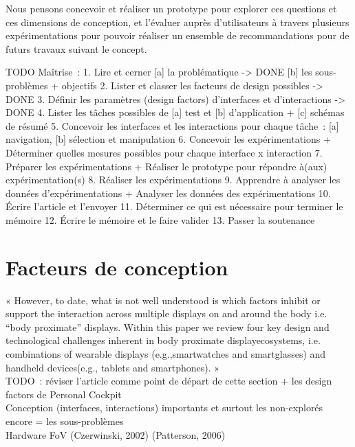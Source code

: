 Nous pensons concevoir et réaliser un prototype pour explorer ces questions et ces dimensions de conception, et l'évaluer auprès d'utilisateurs à travers plusieurs expérimentations pour pouvoir réaliser un ensemble de recommandations pour de futurs travaux suivant le concept.

TODO Maîtrise~:
1. Lire et cerner 
   [a] la problématique -> DONE
   [b] les sous-problèmes + objectifs
2. Lister et classer les facteurs de design possibles -> DONE
3. Définir les paramètres (design factors) d'interfaces et d'interactions -> DONE
4. Lister les tâches possibles de 
   [a] test 
   et [b] d'application 
   + [c] schémas de résumé
5. Concevoir les interfaces et les interactions pour chaque tâche~:
   [a] navigation, 
   [b] sélection et manipulation
6. Concevoir les expérimentations 
   + Déterminer quelles mesures possibles pour chaque interface x interaction
7. Préparer les expérimentations 
   + Réaliser le prototype pour répondre à(aux) expérimentation(s)
8. Réaliser les expérimentations
9. Apprendre à analyser les données d'expérimentations
   + Analyser les données des expérimentations
10. Écrire l'article et l'envoyer
11. Déterminer ce qui est nécessaire pour terminer le mémoire
12. Écrire le mémoire et le faire valider
13. Passer la soutenance



\section*{Facteurs de conception}
« However, to date, what is not well understood is which factors inhibit or support the interaction across multiple displays on and around the body i.e. “body proximate” displays. Within this paper we review four key design and technological challenges inherent in body proximate displayecosystems, i.e. combinations of wearable displays (e.g.,smartwatches and smartglasses) and handheld devices(e.g., tablets and smartphones). » \cite{GrubertKranzQuigley2015} \\
TODO~: réviser l'article comme point de départ de cette section + les design factors de Personal Cockpit \\

Conception (interfaces, interactions) importants et surtout les non-explorés encore = les sous-problèmes \\
	Hardware
        FoV (Czerwinski, 2002) (Patterson, 2006) \cite{KishishitaKiyokawaOrloskyEtAl2014} \\

